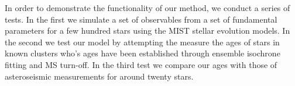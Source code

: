 



In order to demonstrate the functionality of our method, we conduct a series
of tests.
In the first we simulate a set of observables from a set of fundamental
parameters for a few hundred stars using the MIST \citep{choi} stellar
evolution models.
In the second we test our model by attempting the measure the ages of stars in
known clusters who's ages have been established through ensemble isochrone
fitting and MS turn-off.
In the third test we compare our ages with those of asteroseismic measurements
for around twenty stars.

